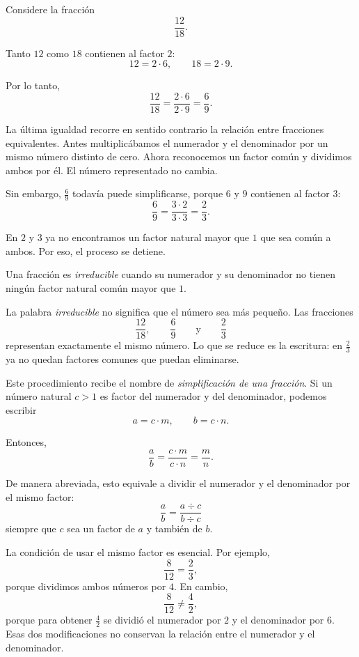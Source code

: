 Considere la fracción
\[
\frac{12}{18}.
\]

Tanto \(12\) como \(18\) contienen al factor \(2\):
\[
12=2\cdot6,
\qquad
18=2\cdot9.
\]

Por lo tanto,
\[
\frac{12}{18}
=
\frac{2\cdot6}{2\cdot9}
=
\frac69.
\]

La última igualdad recorre en sentido contrario la relación entre fracciones
equivalentes. Antes multiplicábamos el numerador y el denominador por un mismo
número distinto de cero. Ahora reconocemos un factor común y dividimos ambos
por él. El número representado no cambia.

Sin embargo, \(\frac69\) todavía puede simplificarse, porque \(6\) y \(9\)
contienen al factor \(3\):
\[
\frac69
=
\frac{3\cdot2}{3\cdot3}
=
\frac23.
\]

En \(2\) y \(3\) ya no encontramos un factor natural mayor que \(1\) que sea
común a ambos. Por eso, el proceso se detiene.

\begin{definition}
Una fracción es \emph{irreducible} cuando su numerador y su denominador no
tienen ningún factor natural común mayor que \(1\).
\end{definition}

La palabra \emph{irreducible} no significa que el número sea más pequeño. Las
fracciones
\[
\frac{12}{18},
\qquad
\frac69
\qquad\text{y}\qquad
\frac23
\]
representan exactamente el mismo número. Lo que se reduce es la escritura: en
\(\frac23\) ya no quedan factores comunes que puedan eliminarse.

Este procedimiento recibe el nombre de \emph{simplificación de una fracción}.
Si un número natural \(c>1\) es factor del numerador y del denominador, podemos
escribir
\[
a=c\cdot m,
\qquad
b=c\cdot n.
\]

Entonces,
\[
\frac ab
=
\frac{c\cdot m}{c\cdot n}
=
\frac mn.
\]

De manera abreviada, esto equivale a dividir el numerador y el denominador por
el mismo factor:
\[
\boxed{
\frac ab
=
\frac{a\div c}{b\div c}
}
\]
siempre que \(c\) sea un factor de \(a\) y también de \(b\).

La condición de usar el mismo factor es esencial. Por ejemplo,
\[
\frac8{12}=\frac23,
\]
porque dividimos ambos números por \(4\). En cambio,
\[
\frac8{12}\ne\frac42,
\]
porque para obtener \(\frac42\) se dividió el numerador por \(2\) y el
denominador por \(6\). Esas dos modificaciones no conservan la relación entre
el numerador y el denominador.

